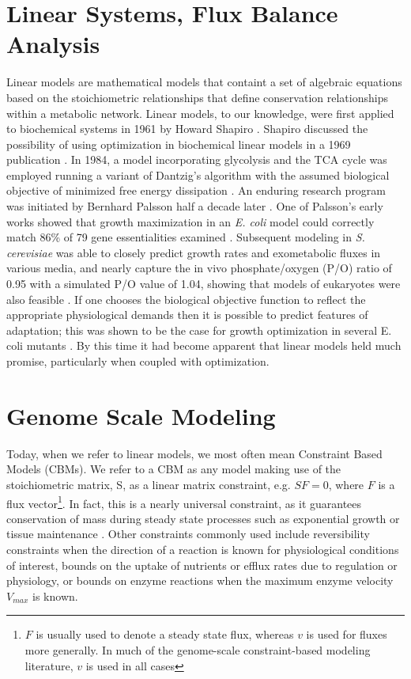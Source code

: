 \documentclass[phd,tocprelim,draft]{cornell}
\newcommand{\citep}[1]{\cite{#1}}
\begin{document}
\section{Linear Systems, Flux Balance Analysis}
Linear models are mathematical models that containt a set of algebraic
equations based on the stoichiometric relationships that define
conservation relationships within a metabolic network.  Linear models,
to our knowledge, were first applied to biochemical systems in 1961 by
Howard Shapiro \citep{Shapiro1961}. Shapiro discussed the possibility
of using optimization in biochemical linear models in a 1969
publication \citep{Shapiro1969}. In 1984, a model incorporating
glycolysis and the TCA cycle was employed running a variant of
Dantzig’s algorithm with the assumed biological objective of minimized
free energy dissipation \citep{Panne1985, Watson1984}. An enduring
research program was initiated by Bernhard Palsson half a decade later
\citep{Savinell1992a, Savinell1992}. One of Palsson's early works
showed that growth maximization in an \textit{E. coli} model could
correctly match 86\% of 79 gene essentialities examined
\citep{Edwards2000}. Subsequent modeling in \textit{S. cerevisiae} was
able to closely predict growth rates and exometabolic fluxes in
various media, and nearly capture the in vivo phosphate/oxygen (P/O)
ratio of 0.95 with a simulated P/O value of 1.04, showing that models
of eukaryotes were also feasible \citep{Famili2003}. If one chooses
the biological objective function to reflect the appropriate
physiological demands then it is possible to predict features of
adaptation; this was shown to be the case for growth optimization in
several E. coli mutants \citep{Fong2004_sb2013}. By this time it had
become apparent that linear models held much promise, particularly
when coupled with optimization.


\section{Genome Scale Modeling}
Today, when we refer to linear models, we most often mean Constraint
Based Models (CBMs). We refer to a CBM as any model making use of the
stoichiometric matrix, S, as a linear matrix constraint, e.g. $SF =
0$, where $F$ is a flux vector\footnote{$F$ is usually used to denote a
steady state flux, whereas $v$ is used for fluxes more generally. In
much of the genome-scale constraint-based modeling literature, $v$ is
used in all cases}. In fact, this is a nearly universal
constraint, as it guarantees conservation of mass during steady state
processes such as exponential growth or tissue maintenance \citep{Fleming2012}. 
Other constraints commonly used include reversibility constraints when the
direction of a reaction is known for physiological conditions of
interest, bounds on the uptake of nutrients or efflux rates due to
regulation or physiology, or bounds on enzyme reactions when the
maximum enzyme velocity $V_{max}$ is known.
\end{document}
